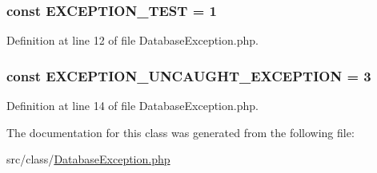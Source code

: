 \subsubsection[{E\+X\+C\+E\+P\+T\+I\+O\+N\+\_\+\+T\+E\+S\+T}]{\setlength{\rightskip}{0pt plus 5cm}const E\+X\+C\+E\+P\+T\+I\+O\+N\+\_\+\+T\+E\+S\+T = 1}\label{class_database_exception_ad70fde01b9fdf6cab7de36cb7f2329dd}


Definition at line 12 of file Database\+Exception.\+php.

\hypertarget{class_database_exception_aa329d5b77c2ad7a40e283926c6c6dc2e}{}
\subsubsection[{E\+X\+C\+E\+P\+T\+I\+O\+N\+\_\+\+U\+N\+C\+A\+U\+G\+H\+T\+\_\+\+E\+X\+C\+E\+P\+T\+I\+O\+N}]{\setlength{\rightskip}{0pt plus 5cm}const E\+X\+C\+E\+P\+T\+I\+O\+N\+\_\+\+U\+N\+C\+A\+U\+G\+H\+T\+\_\+\+E\+X\+C\+E\+P\+T\+I\+O\+N = 3}\label{class_database_exception_aa329d5b77c2ad7a40e283926c6c6dc2e}


Definition at line 14 of file Database\+Exception.\+php.



The documentation for this class was generated from the following file\+:\begin{DoxyCompactItemize}
\item 
src/class/\hyperlink{_database_exception_8php}{Database\+Exception.\+php}\end{DoxyCompactItemize}
